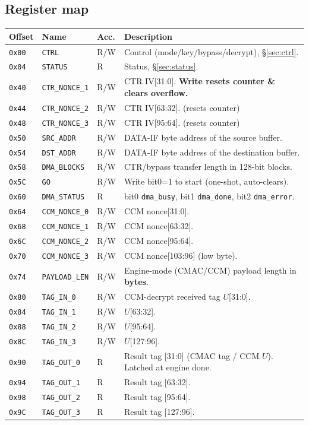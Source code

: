 \documentclass[11pt,a4paper]{article}
\newcommand{\reg}[1]{\texttt{#1}}
\begin{document}
\subsection{Register map}\label{sec:regmap}
\begin{longtable}{@{}p{} p{} p{} p{}@{}}
\hline
\textbf{Offset} & \textbf{Name} & \textbf{Acc.} & \textbf{Description} \\ \hline \endhead
\texttt{0x00} & \reg{CTRL}         & R/W & Control (mode/key/bypass/decrypt), \S\ref{sec:ctrl}. \\
\texttt{0x04} & \reg{STATUS}       & R   & Status, \S\ref{sec:status}. \\
\texttt{0x40} & \reg{CTR\_NONCE\_1} & R/W & CTR IV[31:0]. \textbf{Write resets counter \& clears overflow.} \\
\texttt{0x44} & \reg{CTR\_NONCE\_2} & R/W & CTR IV[63:32]. (resets counter) \\
\texttt{0x48} & \reg{CTR\_NONCE\_3} & R/W & CTR IV[95:64]. (resets counter) \\
\texttt{0x50} & \reg{SRC\_ADDR}    & R/W & DATA-IF byte address of the source buffer. \\
\texttt{0x54} & \reg{DST\_ADDR}    & R/W & DATA-IF byte address of the destination buffer. \\
\texttt{0x58} & \reg{DMA\_BLOCKS}  & R/W & CTR/bypass transfer length in 128-bit blocks. \\
\texttt{0x5C} & \reg{GO}           & R/W & Write bit0=1 to start (one-shot, auto-clears). \\
\texttt{0x60} & \reg{DMA\_STATUS}  & R   & bit0 \texttt{dma\_busy}, bit1 \texttt{dma\_done}, bit2 \texttt{dma\_error}. \\
\texttt{0x64} & \reg{CCM\_NONCE\_0} & R/W & CCM nonce[31:0]. \\
\texttt{0x68} & \reg{CCM\_NONCE\_1} & R/W & CCM nonce[63:32]. \\
\texttt{0x6C} & \reg{CCM\_NONCE\_2} & R/W & CCM nonce[95:64]. \\
\texttt{0x70} & \reg{CCM\_NONCE\_3} & R/W & CCM nonce[103:96] (low byte). \\
\texttt{0x74} & \reg{PAYLOAD\_LEN}  & R/W & Engine-mode (CMAC/CCM) payload length in \textbf{bytes}. \\
\texttt{0x80} & \reg{TAG\_IN\_0}   & R/W & CCM-decrypt received tag \(U\)[31:0]. \\
\texttt{0x84} & \reg{TAG\_IN\_1}   & R/W & \(U\)[63:32]. \\
\texttt{0x88} & \reg{TAG\_IN\_2}   & R/W & \(U\)[95:64]. \\
\texttt{0x8C} & \reg{TAG\_IN\_3}   & R/W & \(U\)[127:96]. \\
\texttt{0x90} & \reg{TAG\_OUT\_0}  & R   & Result tag [31:0] (CMAC tag / CCM \(U\)). Latched at engine done. \\
\texttt{0x94} & \reg{TAG\_OUT\_1}  & R   & Result tag [63:32]. \\
\texttt{0x98} & \reg{TAG\_OUT\_2}  & R   & Result tag [95:64]. \\
\texttt{0x9C} & \reg{TAG\_OUT\_3}  & R   & Result tag [127:96]. \\ \hline
\end{longtable}
\end{document}
